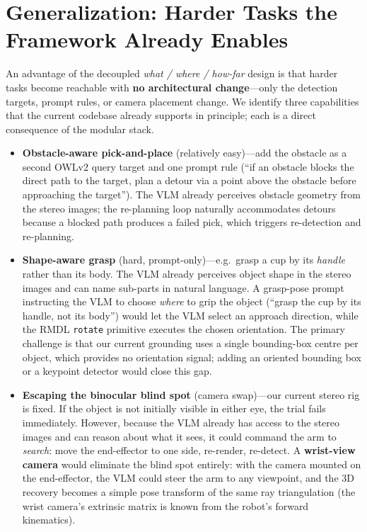 \documentclass[conference]{IEEEtran}
\providecommand{\alert}[1]{\textbf{\textcolor{accent2}{#1}}}
\begin{document}
\section{Generalization: Harder Tasks the Framework Already Enables}
\label{sec:generalization}

An advantage of the decoupled \emph{what / where / how-far} design is that harder tasks become reachable with \alert{no architectural change}---only the detection targets, prompt rules, or camera placement change. We identify three capabilities that the current codebase already supports in principle; each is a direct consequence of the modular stack.

\begin{itemize}
\item \textbf{Obstacle-aware pick-and-place} \textcolor{accent3}{(relatively easy)}---add the obstacle as a second OWLv2 query target and one prompt rule (``if an obstacle blocks the direct path to the target, plan a detour via a point above the obstacle before approaching the target''). The VLM already perceives obstacle geometry from the stereo images; the re-planning loop naturally accommodates detours because a blocked path produces a failed pick, which triggers re-detection and re-planning.
\item \textbf{Shape-aware grasp} \textcolor{accent2}{(hard, prompt-only)}---e.g.\ grasp a cup by its \emph{handle} rather than its body. The VLM already perceives object shape in the stereo images and can name sub-parts in natural language. A grasp-pose prompt instructing the VLM to choose \emph{where} to grip the object (``grasp the cup by its handle, not its body'') would let the VLM select an approach direction, while the RMDL \texttt{rotate} primitive executes the chosen orientation. The primary challenge is that our current grounding uses a single bounding-box centre per object, which provides no orientation signal; adding an oriented bounding box or a keypoint detector would close this gap.
\item \textbf{Escaping the binocular blind spot} \textcolor{accent}{(camera swap)}---our current stereo rig is fixed. If the object is not initially visible in either eye, the trial fails immediately. However, because the VLM already has access to the stereo images and can reason about what it sees, it could command the arm to \emph{search}: move the end-effector to one side, re-render, re-detect. A \textbf{wrist-view camera} would eliminate the blind spot entirely: with the camera mounted on the end-effector, the VLM could steer the arm to any viewpoint, and the 3D recovery becomes a simple pose transform of the same ray triangulation (the wrist camera's extrinsic matrix is known from the robot's forward kinematics).
\end{itemize}
\end{document}
